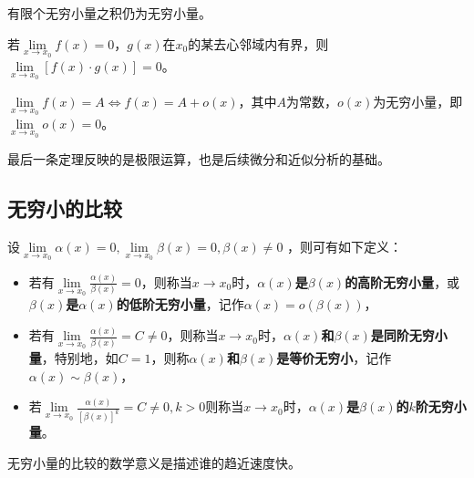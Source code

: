 \begin{theorem}[有限积定理]
有限个无穷小量之积仍为无穷小量。
\end{theorem}

\begin{theorem}[有界积定理]
若$\underset{x\rightarrow x_0}{\lim}f\left( x \right) =0$，$g\left( x \right) $在$x_0$的某去心邻域内有界，则$\underset{x\rightarrow x_0}{\lim}\left[ f\left( x \right) \cdot g\left( x \right) \right] =0$。
\end{theorem}

\begin{theorem}
$\underset{x\rightarrow x_0}{\lim}f\left( x \right) =A\Leftrightarrow f\left( x \right) =A+o\left( x \right) $，其中$A$为常数，$o\left( x \right) $为无穷小量，即$\underset{x\rightarrow x_0}{\lim}o\left( x \right) =0$。
\end{theorem}

最后一条定理反映的是极限运算，也是后续微分和近似分析的基础。

\subsection{无穷小的比较}

\begin{definition}
设$\underset{x\rightarrow x_0}{\lim}\alpha \left( x \right) =0,\underset{x\rightarrow x_0}{\lim}\beta \left( x \right) =0,\beta \left( x \right) \ne 0$ ，则可有如下定义：
\begin{itemize}
    \item 若有$\underset{x\rightarrow x_0}{\lim}\frac{\alpha \left( x \right)}{\beta \left( x \right)}=0$，则称当$x\rightarrow x_0$时，{\bf $\alpha \left( x \right) $是$\beta \left( x \right) $的高阶无穷小量}，或{\bf $\beta \left( x \right) $是$\alpha \left( x \right) $的低阶无穷小量}，记作$\alpha \left( x \right) =o\left( \beta \left( x \right) \right) $，
    \item 若有$\underset{x\rightarrow x_0}{\lim}\frac{\alpha \left( x \right)}{\beta \left( x \right)}=C\ne 0$，则称当$x\rightarrow x_0$时，{\bf $\alpha \left( x \right) $和$\beta \left( x \right) $是同阶无穷小量}，特别地，如$C=1$，则称{\bf $\alpha \left( x \right) $和$\beta \left( x \right) $是等价无穷小}，记作$\alpha \left( x \right) \sim \beta \left( x \right) $，
    \item 若$\underset{x\rightarrow x_0}{\lim}\frac{\alpha \left( x \right)}{\left[ \beta \left( x \right) \right] ^k}=C\ne 0,k>0$则称当$x\rightarrow x_0$时，{\bf $\alpha \left( x \right) $是$\beta \left( x \right) $的$k$阶无穷小量}。
\end{itemize}
\end{definition}

无穷小量的比较的数学意义是描述谁的趋近速度快。




